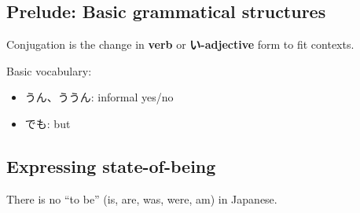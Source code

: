\documentclass[../nihongo-gakushuu-kyouzai.tex]{subfiles}
\begin{document}

\subsection{Prelude: Basic grammatical structures}
Conjugation is the change in \textbf{verb} or \textbf{い-adjective} form to fit contexts.

Basic vocabulary:
\begin{itemize}
    \item うん、ううん: informal yes/no
    \item でも: but
\end{itemize}

\subsection{Expressing state-of-being} \label{sec:expressing-state-of-being}
There is no ``to be'' (is, are, was, were, am) in Japanese.
\end{document}
